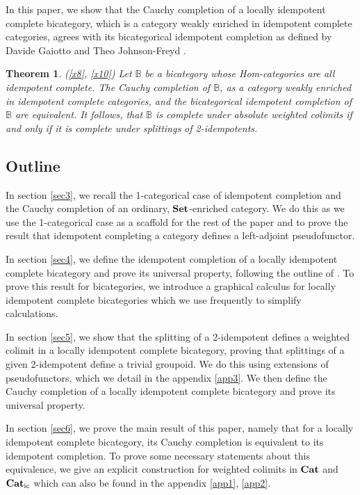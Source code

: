 \documentclass[12pt,oneside,reqno,a4paper]{article}
\newtheorem{theorem}{Theorem}[section]
\theoremstyle{definition}
\newcommand{\Set}{\textbf{\textup{Set}}}
\newcommand{\Cat}{\textbf{\textup{Cat}}}
\newcommand{\Catic}{\textbf{\textup{Cat}}_\textup{ic}}
\newcommand{\bB}{\mathbb{B}}
\begin{document}
In this paper, we show that the Cauchy completion of a locally idempotent complete bicategory, which is a category weakly enriched in idempotent complete categories, agrees with its bicategorical idempotent completion as defined by Davide Gaiotto and Theo Johnson-Freyd \cite{GJF}.

\begin{theorem}(\ref{x8}, \ref{x10})
Let $\bB$ be a bicategory whose Hom-categories are all idempotent complete. The Cauchy completion of $\bB$, as a category weakly enriched in idempotent complete categories, and the bicategorical idempotent completion of $\bB$ are equivalent. It follows, that $\bB$ is complete under absolute weighted colimits if and only if it is complete under splittings of 2-idempotents.
\end{theorem}

\subsection{Outline}

In section \ref{sec3}, we recall the 1-categorical case of idempotent completion and the Cauchy completion of an ordinary, $\Set$-enriched category. We do this as we use the 1-categorical case as a scaffold for the rest of the paper and to prove the result that idempotent completing a category defines a left-adjoint pseudofunctor.

In section \ref{sec4}, we define the idempotent completion of a locally idempotent complete bicategory and prove its universal property, following the outline of \cite[Theorem 2.3.11.]{GJF}. To prove this result for bicategories, we introduce a graphical calculus for locally idempotent complete bicategories which we use frequently to simplify calculations.

In section \ref{sec5}, we show that the splitting of a 2-idempotent defines a weighted colimit in a locally idempotent complete bicategory, proving that splittings of a given 2-idempotent define a trivial groupoid. We do this using extensions of pseudofunctors, which we detail in the appendix \ref{app3}. We then define the Cauchy completion of a locally idempotent complete bicategory and prove its universal property.

In section \ref{sec6}, we prove the main result of this paper, namely that for a locally idempotent complete bicategory, its Cauchy completion is equivalent to its idempotent completion. To prove some necessary statements about this equivalence, we give an explicit construction for weighted colimits in $\Cat$ and $\Catic$ which can also be found in the appendix \ref{app1}, \ref{app2}.
\end{document}
